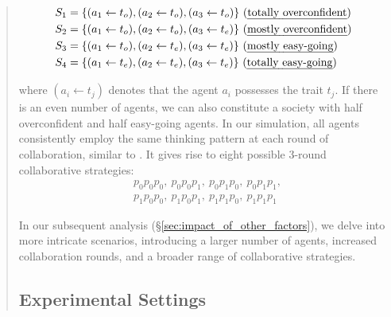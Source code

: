 \documentclass[11pt]{article}
\begin{document}
\begin{abstract}
\vspace{-4mm}
\begin{small}
\begin{align*}
    S_1 &= \{(a_1 \leftarrow t_o), (a_2 \leftarrow t_o), (a_3 \leftarrow t_o)\} ~\text{(\emph{totally overconfident})} \\
    S_2 &= \{(a_1 \leftarrow t_o), (a_2 \leftarrow t_o), (a_3 \leftarrow t_e)\} ~\text{(\emph{mostly overconfident})} \\
    S_3 &= \{(a_1 \leftarrow t_o), (a_2 \leftarrow t_e), (a_3 \leftarrow t_e)\} ~\text{(\emph{mostly easy-going})} \\
    S_4 &= \{(a_1 \leftarrow t_e), (a_2 \leftarrow t_e), (a_3 \leftarrow t_e)\} ~\text{(\emph{totally easy-going})}
\end{align*}
\end{small}
where $(a_i \leftarrow t_j)$ denotes that the agent $a_i$ possesses the trait $t_j$. If there is an even number of agents, 
we can also constitute a society with half overconfident and half easy-going agents. 
In our simulation, all agents consistently employ the same thinking pattern at each round of collaboration, similar to \citet{arXiv2023_MultiAgent-Debate}.  %
It gives rise to eight possible 3-round collaborative strategies: 
\begin{align*}
    & p_0p_0p_0,\ p_0p_0p_1,\ p_0p_1p_0,\ p_0p_1p_1,\\ 
    & p_1p_0p_0,\ p_1p_0p_1,\ p_1p_1p_0,\ p_1p_1p_1
\end{align*}

In our subsequent analysis (\S\ref{sec:impact_of_other_factors}), we delve into more intricate scenarios, introducing a larger number of agents, increased collaboration rounds, and a broader range of collaborative strategies. 


\subsection{Experimental Settings}


\end{abstract}
\end{document}
